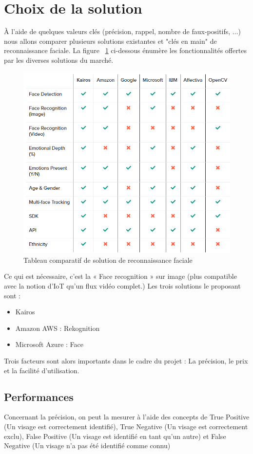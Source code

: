 \section{Choix de la solution}

À l'aide de quelques valeurs clés (précision, rappel, nombre de faux-positifs, ...) nous allons comparer plusieurs solutions existantes et "clés en main" de reconnaissance faciale.
La figure ~\ref{fig:tab-comparatif-reco} ci-dessous énumère les fonctionnalités offertes par les diverses solutions du marché.

\begin{figure}[H]
	\centering
	\includegraphics[width=12cm]{images/proto-4.png}
	\caption{Tableau comparatif de solution de reconnaissance faciale}
	\label{fig:tab-comparatif-reco}
\end{figure}

Ce qui est nécessaire, c’est la « Face recognition » sur image (plus compatible avec la notion d’IoT qu’un flux vidéo
complet.) Les trois solutions le proposant sont :

\begin{itemize}
\item Kairos
\item Amazon AWS : Rekognition
\item Microsoft Azure : Face
\end{itemize}

Trois facteurs sont alors importants dans le cadre du projet : La précision, le prix et la facilité d’utilisation.

\subsection{Performances}
Concernant la précision, on peut la mesurer à l’aide des concepts de True Positive (Un visage est correctement
identifié), True Negative (Un visage est correctement exclu), False Positive (Un visage est identifié en tant qu’un
autre) et False Negative (Un visage n’a pas été identifié comme connu)

